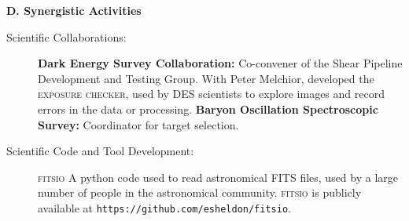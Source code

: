 \documentclass[10pt]{article}
\begin{document}
{\large \bf D. Synergistic Activities}
\begin{description}

    \item[Scientific Collaborations:] {\bf Dark Energy Survey Collaboration:}
        Co-convener of the Shear Pipeline Development and Testing Group. With
        Peter Melchior, developed
        the \textsc{exposure checker}, used by DES scientists to explore images
        and record errors in the data or processing.  {\bf
        Baryon Oscillation Spectroscopic Survey:} Coordinator for target
        selection.

    \item[Scientific Code and Tool Development:] \textsc{fitsio} A python code
        used to read astronomical FITS files, used by a large number of
        people in the astronomical community.  \textsc{fitsio} is publicly
        available at \verb+https://github.com/esheldon/fitsio+.

\end{description}

\end{document}
